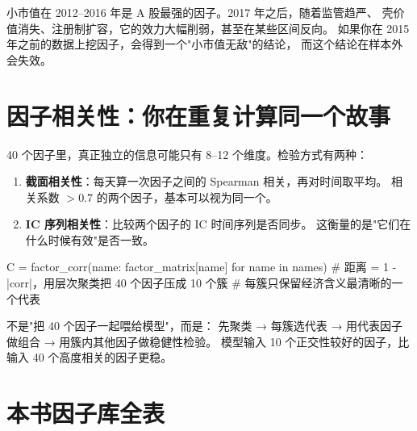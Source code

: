 \begin{warnbox}
小市值在 2012--2016 年是 A 股最强的因子。2017 年之后，随着监管趋严、
壳价值消失、注册制扩容，它的效力大幅削弱，甚至在某些区间反向。
如果你在 2015 年之前的数据上挖因子，会得到一个"小市值无敌"的结论，
而这个结论在样本外会失效。
\end{warnbox}

\section{因子相关性：你在重复计算同一个故事}

40 个因子里，真正独立的信息可能只有 8--12 个维度。检验方式有两种：

\begin{enumerate}
  \item \textbf{截面相关性}：每天算一次因子之间的 Spearman 相关，再对时间取平均。
        相关系数 $> 0.7$ 的两个因子，基本可以视为同一个。
  \item \textbf{IC 序列相关性}：比较两个因子的 IC 时间序列是否同步。
        这衡量的是"它们在什么时候有效"是否一致。
\end{enumerate}

\begin{pycode}[因子相关性矩阵]
C = factor_corr({name: factor_matrix[name] for name in names})
# 距离 = 1 - |corr|，用层次聚类把 40 个因子压成 10 个簇
# 每簇只保留经济含义最清晰的一个代表
\end{pycode}

\begin{keybox}[因子库的正确用法]
不是"把 40 个因子一起喂给模型"，而是：
先聚类 → 每簇选代表 → 用代表因子做组合 → 用簇内其他因子做稳健性检验。
模型输入 10 个正交性较好的因子，比输入 40 个高度相关的因子更稳。
\end{keybox}

\section{本书因子库全表}

